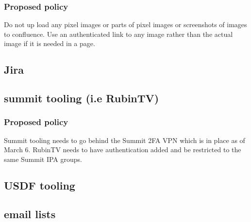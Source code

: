 \subsubsection{Proposed policy}
Do not up load any pixel images or parts of pixel images or screenshots of images to confluence.
Use an authenticated link to any image rather than the actual image if it is needed in a page.



\subsection{Jira}
\subsection{summit tooling (i.e RubinTV)}
\subsubsection{Proposed policy}
Summit tooling needs to go behind the Summit 2FA VPN which is in place as of March 6.
RubinTV needs to have authentication added and be restricted to the same Summit IPA groups.

\subsection{USDF tooling}
\subsection{email lists }
